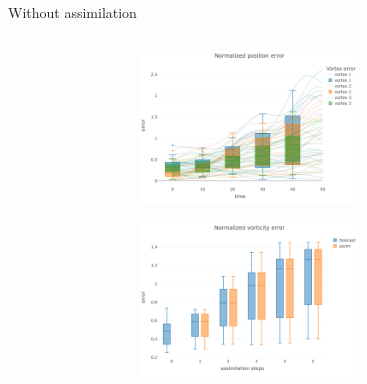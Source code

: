 \documentclass[aspectratio=169]{beamer} %
\begin{document}
\begin{frame}{Without assimilation}
    \vspace{-0.5cm}
    \begin{columns}
        \begin{column}{0.5\textwidth}
            \begin{figure}[t]
                \centering
            \end{figure}
        \end{column}
        \begin{column}{0.5\textwidth}
            \begin{figure}
                \centering
                \begin{subfigure}{\textwidth}
                    \centering
                    \includegraphics[width=0.75\textwidth]{images/error_position_wo_assim.pdf}
                \end{subfigure}
                \begin{subfigure}{\textwidth}
                    \centering
                    \includegraphics[width=0.75\textwidth]{images/error_vorticity_wo_assim.pdf}
                \end{subfigure}
            \end{figure}
        \end{column}
    \end{columns}
\end{frame}
\end{document}
